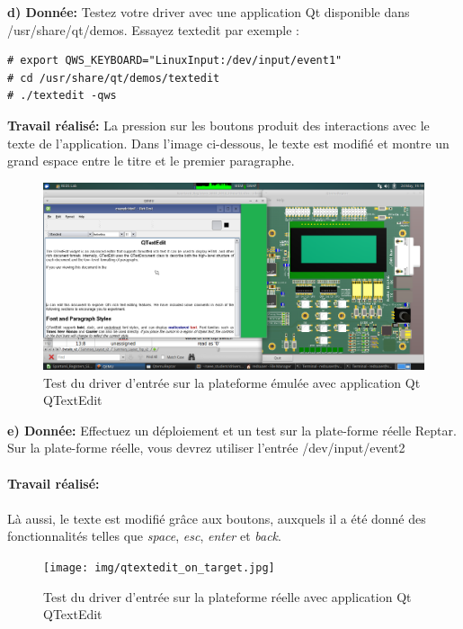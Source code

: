 \textbf{d) Donnée: }Testez votre driver avec une application Qt disponible dans /usr/share/qt/demos. Essayez textedit
par exemple : 
\begin{lstlisting}
# export QWS_KEYBOARD="LinuxInput:/dev/input/event1"
# cd /usr/share/qt/demos/textedit
# ./textedit -qws 
\end{lstlisting}
\textbf{Travail réalisé: }
La pression sur les boutons produit des interactions avec le texte de l'application. Dans l'image ci-dessous, le texte est modifié et montre un grand espace entre le titre et le premier paragraphe.
\begin{figure}[H]
	\begin{center}
		\includegraphics[width=17cm]{img/qtextedit_test_emulator.png}
		\caption{Test du driver d'entrée sur la plateforme émulée avec application Qt QTextEdit}
		\label{qtextedit_device_input_emul}
	\end{center}
\end{figure}

\textbf{e) Donnée: }Effectuez un déploiement et un test sur la plate-forme réelle Reptar. Sur la plate-forme réelle, vous
devrez utiliser l'entrée /dev/input/event2\\\\
\textbf{Travail réalisé: }\\\\
Là aussi, le texte est modifié grâce aux boutons, auxquels il a été donné des fonctionnalités telles que \textit{space}, \textit{esc}, \textit{enter} et \textit{back}.
\begin{figure}[H]
	\begin{center}
		\texttt{[image: img/qtextedit\_on\_target.jpg]}
		\caption{Test du driver d'entrée sur la plateforme réelle avec application Qt QTextEdit}
		\label{qtextedit_device_input_reptar}
	\end{center}
\end{figure}


